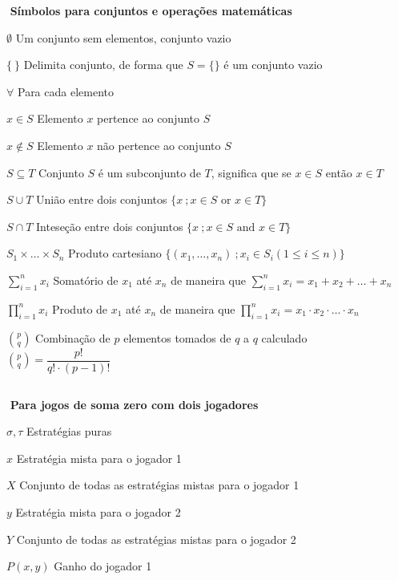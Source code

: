 \begin{simbolos}
	\item[$ $] \textbf{Símbolos para conjuntos e operações matemáticas}
	\item[$ \emptyset $] Um conjunto sem elementos, conjunto vazio
	\item[$ \{\ \} $] Delimita conjunto, de forma que $S = \{\}$ é um conjunto vazio
	\item[$ \forall $] Para cada elemento
	\item[$ x\in S $] Elemento $x$ pertence ao conjunto $S$
	\item[$ x\notin S $] Elemento $x$ não pertence ao conjunto $S$
	\item[$ S\subseteq T $] Conjunto $S$ é um subconjunto de $T$, significa que se $x\!\in\!S$ então $x\!\in\!T$
	\item[$ S\cup T $] União entre dois conjuntos $\{x\ ;x\!\in\!S \text{ or } x\!\in\!T\}$
	\item[$ S\cap T $] Inteseção entre dois conjuntos $\{x\ ;x\!\in\!S \text{ and } x\!\in\!T\}$
	\item[$ S_1\times\ldots\times S_n $] Produto cartesiano $\{(x_1,\ldots,x_n)\ ; x_i\!\in\!S_i (1\leq i\leq n)\}$

	\item[$ \displaystyle\sum_{i=1}^{n} x_i $] Somatório de $x_1$ até $x_n$ de maneira que $\displaystyle\sum_{i=1}^{n} x_i = x_1 + x_2 + \ldots + x_n$
	\item[$ \displaystyle\prod_{i=1}^{n} x_i $] Produto de $x_1$ até $x_n$ de maneira que $\displaystyle\prod_{i=1}^{n} x_i = x_1 \cdot x_2 \cdot \ldots \cdot x_n$
	\item[$ \binom{p}{q} $] Combinação de $p$ elementos tomados de $q$ a $q$ calculado $ \binom{p}{q}=\dfrac{p!}{q!\cdot (p-1)!} $
	\item[$ $]

	\item[$ $] \textbf{Para jogos de soma zero com dois jogadores}
	\item[$ \sigma,\tau $] Estratégias puras
	\item[$ x $] Estratégia mista para o jogador 1
	\item[$ X $] Conjunto de todas as estratégias mistas para o jogador 1
	\item[$ y $] Estratégia mista para o jogador 2
	\item[$ Y $] Conjunto de todas as estratégias mistas para o jogador 2
	\item[$ P(x,y) $] Ganho do jogador 1
	\item[$ $]


\end{simbolos}

